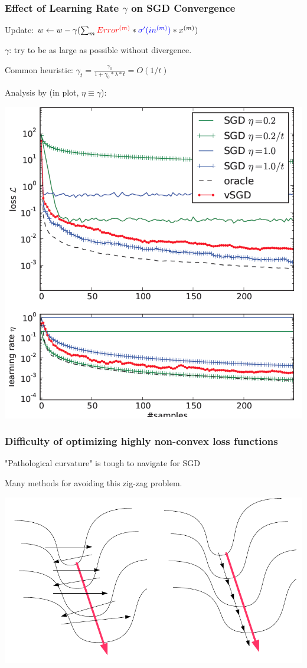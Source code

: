\begin{frame}
\frametitle{Effect of Learning Rate $\gamma$ on SGD Convergence}
\bi
\item Update: $w \leftarrow w - \gamma( \sum_m {\color{red} Error^{(m)}} * {\color{blue} \sigma'(in^{(m)})} * x^{(m)
})$
\bi
        \item $\gamma$: try to be as large as possible without divergence.
        \item Common heuristic: $\gamma_t = \frac{\gamma_0}{1 + \gamma_0 * \lambda * t} = O(1/t)$ 
\ei
\item Analysis by \cite{schaul13learningrate} (in plot, $\eta \equiv \gamma$):
\ei
\centerline{\includegraphics[scale=0.23]{figs/schaul13learningrate}}
\end{frame}


\begin{frame}
\frametitle{Difficulty of optimizing highly non-convex loss functions}
\bi
\item "Pathological curvature" is tough to navigate for SGD 
\item Many methods for avoiding this zig-zag problem.
\ei
\centerline{\includegraphics[scale=0.36]{figs/gradient_vs_newton}}
\end{frame}


